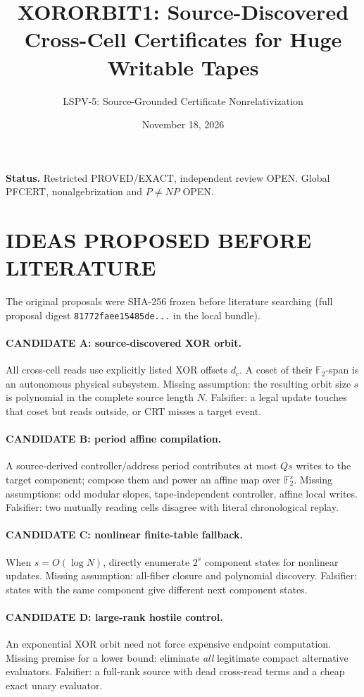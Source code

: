 \documentclass[11pt]{article}
\title{XORORBIT1: Source-Discovered Cross-Cell Certificates for Huge Writable Tapes}
\author{LSPV-5: Source-Grounded Certificate Nonrelativization}
\date{November 18, 2026}
\begin{document}
\maketitle
\noindent\textbf{Status.} Restricted PROVED/EXACT, independent review OPEN.
Global PFCERT, nonalgebrization and $P\ne NP$ OPEN.

\section{IDEAS PROPOSED BEFORE LITERATURE}
The original proposals were SHA-256 frozen before literature searching (full
proposal digest \texttt{81772faee15485de...} in the local bundle).
\paragraph{CANDIDATE A: source-discovered XOR orbit.} All cross-cell
reads use explicitly listed XOR offsets $d_c$. A coset of their
$\mathbb F_2$-span is an autonomous physical subsystem.
Missing assumption: the resulting orbit size $s$ is polynomial in the complete
source length $N$. Falsifier: a legal update touches that coset but reads
outside, or CRT misses a target event.
\paragraph{CANDIDATE B: period affine compilation.} A source-derived
controller/address period contributes at most $Qs$ writes to the target
component; compose them and power an affine map over $\mathbb F_2^s$.
Missing assumptions: odd modular slopes, tape-independent controller,
affine local writes. Falsifier: two mutually reading cells disagree with
literal chronological replay.
\paragraph{CANDIDATE C: nonlinear finite-table fallback.}
When $s=O(\log N)$, directly enumerate $2^s$ component states for
nonlinear updates. Missing assumption: all-fiber closure and polynomial
discovery. Falsifier: states with the same component give different next
component states.
\paragraph{CANDIDATE D: large-rank hostile control.} An exponential XOR
orbit need not force expensive endpoint computation. Missing premise for a
lower bound: eliminate \emph{all} legitimate compact alternative evaluators.
Falsifier: a full-rank source with dead cross-read terms and a cheap exact
unary evaluator.
\end{document}
